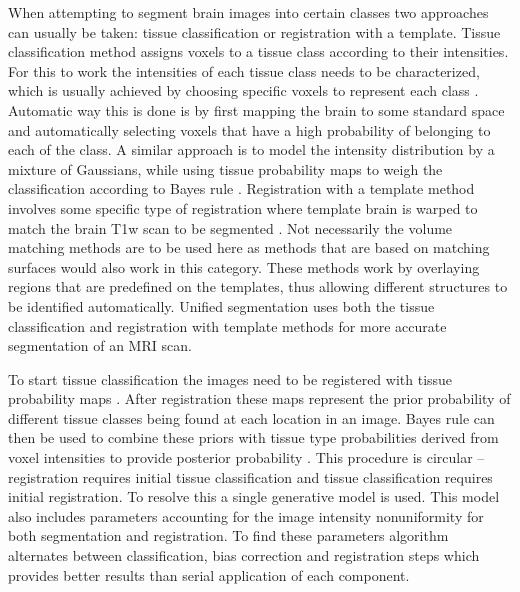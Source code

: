\documentclass[12pt]{article}
\begin{document}
When attempting to segment brain images into certain classes two approaches can usually be taken: tissue classification or registration with a template. Tissue classification method assigns voxels to a tissue class according to their intensities. For this to work the intensities of each tissue class needs to be characterized, which is usually achieved by choosing specific voxels to represent each class \cite{zijdenbos1993brain, alfano2000automated, ballester2000segmentation, van2001automated, kwan1996extensible, kwan1999mri, taylor1994image}. Automatic way this is done is by first mapping the brain to some standard space and automatically selecting voxels that have a high probability of belonging to each of the class. A similar approach is to model the intensity distribution by a mixture of Gaussians, while using tissue probability maps to weigh the classification according to Bayes rule \cite{domingos1997optimality, raizada2013smoothness, rish2001analysis}. Registration with a template method  involves some specific type of registration where template brain is warped to match the brain T1w scan to be segmented \cite{collins1995automatic, crinion2007spatial, ripolles2012analysis}. Not necessarily the volume matching methods are to be used here as methods that are based on matching surfaces \cite{macdonald2000automated, pitiot2004expert, ashton2001automated} would also work in this category. These methods work by overlaying regions that are predefined on the templates, thus allowing different structures to be identified automatically. Unified segmentation uses both the tissue classification and registration with template methods for more accurate segmentation of an MRI scan.

To start tissue classification the images need to be registered with tissue probability maps \cite{ashburner1999nonlinear}. After registration these maps represent the prior probability of different tissue classes being found at each location in an image. Bayes rule can then be used to combine these priors with tissue type probabilities derived from voxel intensities to provide posterior probability \cite{Ashburner2005}. This procedure is circular – registration requires initial tissue classification and tissue classification requires initial registration. To resolve this a single generative model is used. This model also includes parameters accounting for the image intensity nonuniformity for both segmentation and registration. To find these parameters algorithm alternates between classification, bias correction and registration steps which provides better results than serial application of each component.
\end{document}
